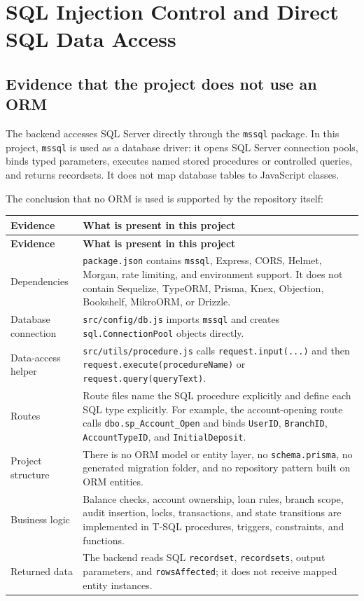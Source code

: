 \documentclass[11pt,a4paper,oneside]{report}
\newcommand{\codepath}[1]{\nolinkurl{#1}}
\begin{document}
\chapter{SQL Injection Control and Direct SQL Data Access}
\section{Evidence that the project does not use an ORM}
The backend accesses SQL Server directly through the \texttt{mssql} package. In this project, \texttt{mssql} is used as a database driver: it opens SQL Server connection pools, binds typed parameters, executes named stored procedures or controlled queries, and returns recordsets. It does not map database tables to JavaScript classes.

The conclusion that no ORM is used is supported by the repository itself:

\begin{longtable}{L{0.28\textwidth}L{0.65\textwidth}}
\toprule
\textbf{Evidence} & \textbf{What is present in this project}\\
\midrule\endfirsthead
\toprule\textbf{Evidence} & \textbf{What is present in this project}\\\midrule\endhead
Dependencies & \texttt{package.json} contains \texttt{mssql}, Express, CORS, Helmet, Morgan, rate limiting, and environment support. It does not contain Sequelize, TypeORM, Prisma, Knex, Objection, Bookshelf, MikroORM, or Drizzle.\\
Database connection & \codepath{src/config/db.js} imports \texttt{mssql} and creates \texttt{sql.ConnectionPool} objects directly.\\
Data-access helper & \codepath{src/utils/procedure.js} calls \texttt{request.input(...)} and then \texttt{request.execute(procedureName)} or \texttt{request.query(queryText)}.\\
Routes & Route files name the SQL procedure explicitly and define each SQL type explicitly. For example, the account-opening route calls \texttt{dbo.sp\_Account\_Open} and binds \texttt{UserID}, \texttt{BranchID}, \texttt{AccountTypeID}, and \texttt{InitialDeposit}.\\
Project structure & There is no ORM model or entity layer, no \texttt{schema.prisma}, no generated migration folder, and no repository pattern built on ORM entities.\\
Business logic & Balance checks, account ownership, loan rules, branch scope, audit insertion, locks, transactions, and state transitions are implemented in T-SQL procedures, triggers, constraints, and functions.\\
Returned data & The backend reads SQL \texttt{recordset}, \texttt{recordsets}, output parameters, and \texttt{rowsAffected}; it does not receive mapped entity instances.\\
\bottomrule
\end{longtable}
\end{document}
